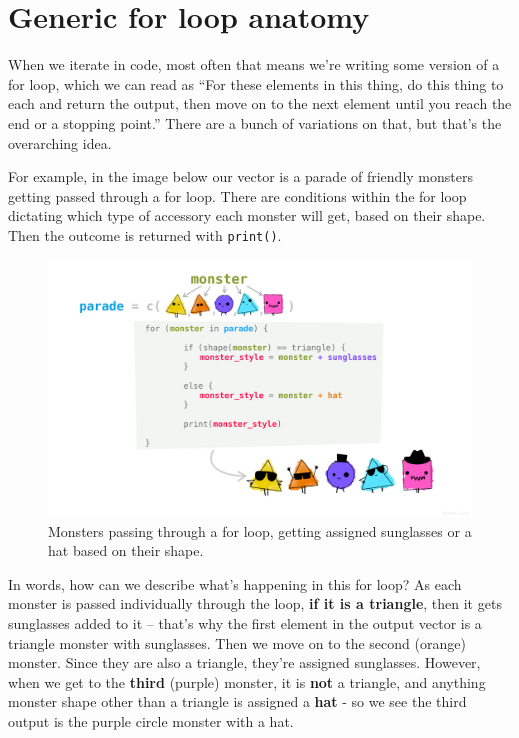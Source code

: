 \documentclass[
]{book}
\begin{document}
\hypertarget{generic-for-loop-anatomy}{%
\section{Generic for loop anatomy}\label{generic-for-loop-anatomy}}

When we iterate in code, most often that means we're writing some version of a for loop, which we can read as ``For these elements in this thing, do this thing to each and return the output, then move on to the next element until you reach the end or a stopping point.'' There are a bunch of variations on that, but that's the overarching idea.

For example, in the image below our vector is a parade of friendly monsters getting passed through a for loop. There are conditions within the for loop dictating which type of accessory each monster will get, based on their shape. Then the outcome is returned with \texttt{print()}.

\begin{figure}
\centering
\includegraphics[width=6.96875in,height=\textheight]{images/for_loop_monsters.png}
\caption{Monsters passing through a for loop, getting assigned sunglasses or a hat based on their shape.}
\end{figure}

In words, how can we describe what's happening in this for loop? As each monster is passed individually through the loop, \textbf{if it is a triangle}, then it gets sunglasses added to it -- that's why the first element in the output vector is a triangle monster with sunglasses. Then we move on to the second (orange) monster. Since they are also a triangle, they're assigned sunglasses. However, when we get to the \textbf{third} (purple) monster, it is \textbf{not} a triangle, and anything monster shape other than a triangle is assigned a \textbf{hat} - so we see the third output is the purple circle monster with a hat.
\end{document}
